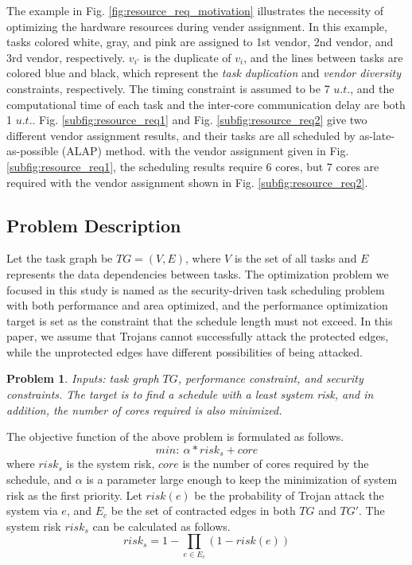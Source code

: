 \documentclass[10pt,journal]{IEEEtran}
\newtheorem{problem}{\textbf{Problem}}
\begin{document}
The example in Fig. \ref{fig:resource_req_motivation} illustrates the necessity of optimizing the hardware resources during vender assignment. In this example, tasks colored white, gray, and pink are assigned to 1st vendor, 2nd vendor, and 3rd vendor, respectively. $v_{i'}$ is the duplicate of $v_i$, and the lines between tasks are colored blue and black, which represent the \textit{task duplication} and \textit{vendor diversity} constraints, respectively. The timing constraint is assumed to be 7 $u.t.$, and the computational time of each task and the inter-core communication delay are both 1 $u.t.$. Fig. \ref{subfig:resource_req1} and Fig. \ref{subfig:resource_req2} give two different vendor assignment results, and their tasks are all scheduled by as-late-as-possible (ALAP) method. with the vendor assignment given in Fig. \ref{subfig:resource_req1}, the scheduling results require 6 cores, but 7 cores are required with the vendor assignment shown in Fig. \ref{subfig:resource_req2}.

\subsection{Problem Description}

Let the task graph be $TG=(V,E)$, where $V$ is the set of all tasks and $E$ represents the data dependencies between tasks. The optimization problem we focused in this study is named as the security-driven task scheduling problem with both performance and area optimized, and the performance optimization target is set as the constraint that the schedule length must not exceed. In this paper, we assume that Trojans cannot successfully attack the protected edges, while the unprotected edges have different possibilities of being attacked.

\begin{problem}
Inputs: task graph $TG$, performance constraint, and security constraints. The target is to find a schedule with a least system risk, and in addition, the number of cores required is also minimized.
\end{problem}

The objective function of the above problem is formulated as follows.
\begin{equation}
min:~\alpha*risk_s+core
\end{equation}
\noindent where $risk_s$ is the system risk, $core$ is the number of cores required by the schedule, and $\alpha$ is a parameter large enough to keep the minimization of system risk as the first priority. Let $risk(e)$ be the  probability of Trojan attack the system via $e$, and $E_c$ be the set of contracted edges in both $TG$ and $TG'$. The system risk $risk_s$ can be calculated as follows.
\begin{equation}
risk_s=1-\prod \limits_{e\in E_c}(1-risk(e))
\end{equation}
\end{document}

